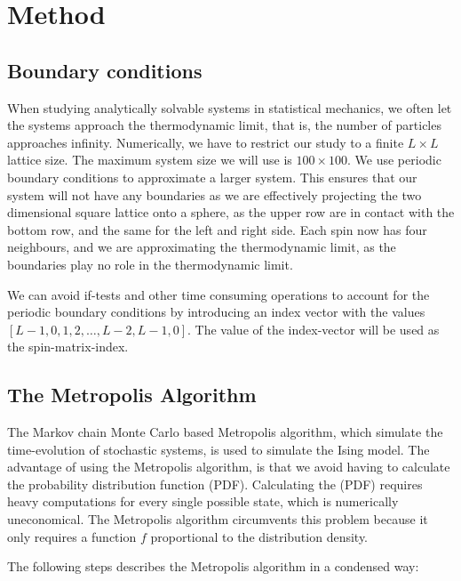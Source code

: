 \documentclass[../main.tex]{subfiles}
\begin{document}
\section{Method}\label{sec:method}

\subsection{Boundary conditions}
When studying analytically solvable systems in statistical mechanics, we often let the systems approach the thermodynamic limit, that is, the number of particles approaches infinity. Numerically, we have to restrict our study to a finite $L\times L$ lattice size. The maximum system size we will use is $100\times 100$. We use periodic boundary conditions to approximate a larger system. This ensures that our system will not have any boundaries as we are effectively projecting the two dimensional square lattice onto a sphere, as the upper row are in contact with the bottom row, and the same for the left and right side. Each spin now has four neighbours, and we are approximating the thermodynamic limit, as the boundaries play no role in the thermodynamic limit. 

We can avoid if-tests and other time consuming operations to account for the periodic boundary conditions by introducing an index vector with the values \ensuremath{[L-1, 0, 1, 2, \ldots, L-2, L-1, 0]}. The value of the index-vector will be used as the spin-matrix-index.

\subsection{The Metropolis Algorithm}
The Markov chain Monte Carlo based Metropolis algorithm, which simulate the time-evolution of stochastic systems, is used to simulate the Ising model. The advantage of using the Metropolis algorithm, is that we avoid having to calculate the probability distribution function (PDF). Calculating the (PDF) requires heavy computations for every single possible state, which is numerically uneconomical. The Metropolis algorithm circumvents this problem because it only requires a function $f$ proportional to the distribution density.

The following steps describes the Metropolis algorithm in a condensed way:
\end{document}
